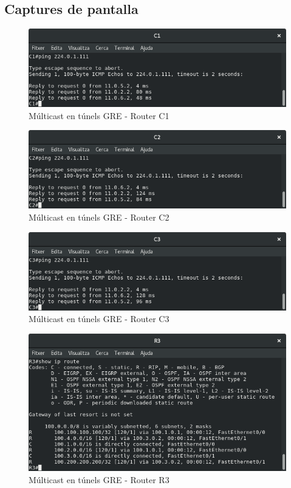 \documentclass[10pt]{article}
\begin{document}
\subsection{Captures de pantalla}
\begin{figure}[H]
\begin{center}
\includegraphics[scale=0.4]{Images/C1.png}
\caption{Múlticast en túnels GRE - Router C1}
\end{center}
\end{figure}
\begin{figure}[H]
\begin{center}
\includegraphics[scale=0.4]{Images/C2.png}
\caption{Múlticast en túnels GRE - Router C2}
\end{center}
\end{figure}
\begin{figure}[H]
\begin{center}
\includegraphics[scale=0.4]{Images/C3.png}
\caption{Múlticast en túnels GRE - Router C3}
\end{center}
\end{figure}
\begin{figure}[H]
\begin{center}
\includegraphics[scale=0.4]{Images/R3.png}
\caption{Múlticast en túnels GRE - Router R3}
\end{center}
\end{figure}
\end{document}
